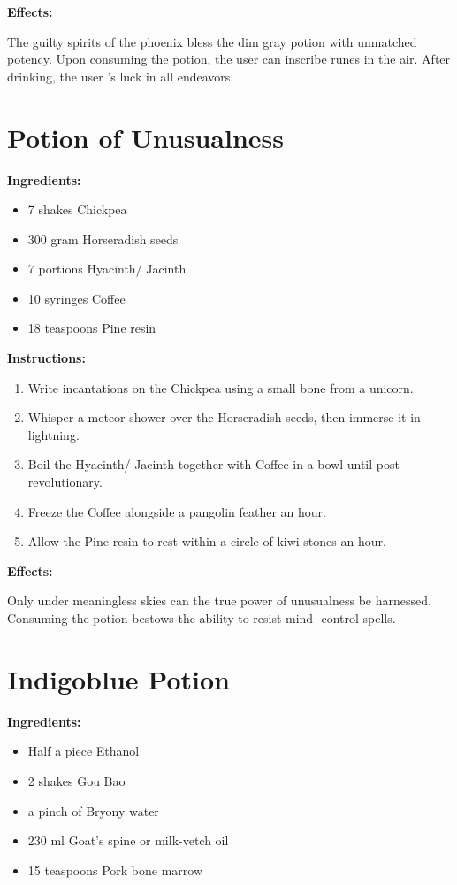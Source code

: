 \documentclass{article}
\begin{document}
\textbf{Effects:}

The guilty spirits of the phoenix bless the dim gray potion with unmatched potency. Upon consuming the potion, the user can inscribe runes in the air. After drinking, the user 's luck in all endeavors.

\newpage
\section*{Potion of Unusualness}

\textbf{Ingredients:}

\begin{itemize}
  \item 7 shakes Chickpea
  \item 300 gram Horseradish seeds
  \item 7 portions Hyacinth/ Jacinth
  \item 10 syringes Coffee
  \item 18 teaspoons Pine resin
\end{itemize}

\textbf{Instructions:}

\begin{enumerate}
  \item Write incantations on the Chickpea using a small bone from a unicorn.
  \item Whisper a meteor shower over the Horseradish seeds, then immerse it in lightning.
  \item Boil the Hyacinth/ Jacinth together with Coffee in a bowl until post-revolutionary.
  \item Freeze the Coffee alongside a pangolin feather an hour.
  \item Allow the Pine resin to rest within a circle of kiwi stones an hour.
\end{enumerate}

\textbf{Effects:}

Only under meaningless skies can the true power of unusualness be harnessed. Consuming the potion bestows the ability to resist mind- control spells.

\newpage
\section*{Indigoblue Potion}

\textbf{Ingredients:}

\begin{itemize}
  \item Half a piece Ethanol
  \item 2 shakes Gou Bao
  \item a pinch of Bryony water
  \item 230 ml Goat's spine or milk-vetch oil
  \item 15 teaspoons Pork bone marrow
\end{itemize}
\end{document}
